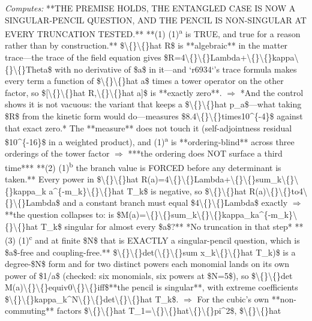 \begin{description}
\emph{Computes:} **THE PREMISE HOLDS, THE ENTANGLED CASE IS NOW A SINGULAR-PENCIL QUESTION, AND THE PENCIL IS NON-SINGULAR AT EVERY TRUNCATION TESTED.**  **(1) (1)\textsuperscript{a} is TRUE, and true for a reason rather than by construction.** \$\textbackslash\{\}\textbackslash\{\}hat R\$ is **algebraic** in the matter trace---the trace of the field equation gives \$R=4\textbackslash\{\}\textbackslash\{\}Lambda+\textbackslash\{\}\textbackslash\{\}kappa\textbackslash\{\}\textbackslash\{\}Theta\$ with no derivative of \$a\$ in it---and `r6934`'s trace formula makes every term a function of \$\textbackslash\{\}\textbackslash\{\}hat a\$ times a tower operator on the other factor, so \$[\textbackslash\{\}\textbackslash\{\}hat R,\textbackslash\{\}\textbackslash\{\}hat a]\$ is **exactly zero**. \ensuremath{\Rightarrow} *And the control shows it is not vacuous: the variant that keeps a \$\textbackslash\{\}\textbackslash\{\}hat p\_a\$---what taking \$R\$ from the kinetic form would do---measures \$8.4\textbackslash\{\}\textbackslash\{\}times10\textasciicircum{}\{-4\}\$ against that exact zero.* The **measure** does not touch it (self-adjointness residual \$10\textasciicircum{}\{-16\}\$ in a weighted product), and (1)\textsuperscript{a} is **ordering-blind** across three orderings of the tower factor \ensuremath{\Rightarrow} ***the ordering does NOT surface a third time***  **(2) (1)\textsuperscript{b} the branch value is FORCED before any determinant is taken.** Every power in \$\textbackslash\{\}\textbackslash\{\}hat R(a)=4\textbackslash\{\}\textbackslash\{\}Lambda+\textbackslash\{\}\textbackslash\{\}sum\_k\textbackslash\{\}\textbackslash\{\}kappa\_k a\textasciicircum{}\{-m\_k\}\textbackslash\{\}\textbackslash\{\}hat T\_k\$ is negative, so \$\textbackslash\{\}\textbackslash\{\}hat R(a)\textbackslash\{\}\textbackslash\{\}to4\textbackslash\{\}\textbackslash\{\}Lambda\$ and a constant branch must equal \$4\textbackslash\{\}\textbackslash\{\}Lambda\$ exactly \ensuremath{\Rightarrow} **the question collapses to: is \$M(a)=\textbackslash\{\}\textbackslash\{\}sum\_k\textbackslash\{\}\textbackslash\{\}kappa\_ka\textasciicircum{}\{-m\_k\}\textbackslash\{\}\textbackslash\{\}hat T\_k\$ singular for almost every \$a\$?** *No truncation in that step*  **(3) (1)\textsuperscript{c} and at finite \$N\$ that is EXACTLY a singular-pencil question, which is \$a\$-free and coupling-free.** \$\textbackslash\{\}\textbackslash\{\}det(\textbackslash\{\}\textbackslash\{\}sum x\_k\textbackslash\{\}\textbackslash\{\}hat T\_k)\$ is a degree-\$N\$ form and for two distinct powers each monomial lands on its own power of \$1/a\$ (checked: six monomials, six powers at \$N=5\$), so \$\textbackslash\{\}\textbackslash\{\}det M(a)\textbackslash\{\}\textbackslash\{\}equiv0\textbackslash\{\}\textbackslash\{\}iff\$**the pencil is singular**, with extreme coefficients \$\textbackslash\{\}\textbackslash\{\}kappa\_k\textasciicircum{}N\textbackslash\{\}\textbackslash\{\}det\textbackslash\{\}\textbackslash\{\}hat T\_k\$. \ensuremath{\Rightarrow} For the cubic's own **non-commuting** factors \$\textbackslash\{\}\textbackslash\{\}hat T\_1=\textbackslash\{\}\textbackslash\{\}hat\textbackslash\{\}\textbackslash\{\}pi\textasciicircum{}2\$, \$\textbackslash\{\}\textbackslash\{\}hat 
\end{description}
